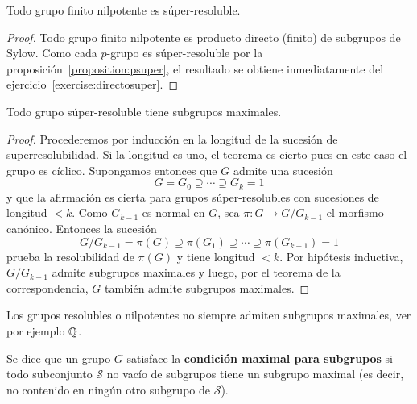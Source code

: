 \begin{corollary}
	Todo grupo finito nilpotente es súper-resoluble.
\end{corollary}

\begin{proof}
	Todo grupo finito nilpotente es producto directo (finito) de subgrupos de
	Sylow. Como cada $p$-grupo es súper-resoluble por la
	proposición~\ref{proposition:psuper}, el resultado se obtiene
	inmediatamente del ejercicio~\ref{exercise:directosuper}.
\end{proof}

\begin{theorem}
	Todo grupo súper-resoluble tiene subgrupos maximales.	
\end{theorem}

\begin{proof}
	Procederemos por inducción en la longitud de la sucesión de
	superresolubilidad. Si la longitud es uno, el teorema es cierto pues en
	este caso el grupo es cíclico. Supongamos entonces que $G$ admite una
	sucesión
	\[
		G=G_0\supseteq\cdots\supseteq G_k=1
	\]
	y que la afirmación es cierta para grupos súper-resolubles con sucesiones 
	de longitud $<k$. Como $G_{k-1}$ es normal en $G$, sea $\pi\colon G\to
	G/G_{k-1}$ el morfismo canónico. Entonces la sucesión
	\[
		G/G_{k-1}=\pi(G)\supseteq \pi(G_1)\supseteq\cdots\supseteq\pi(G_{k-1})=1
	\]
	prueba la resolubilidad de $\pi(G)$ y tiene longitud $<k$. Por hipótesis
	inductiva, $G/G_{k-1}$ admite subgrupos maximales y luego, por el teorema
	de la correspondencia, $G$ también admite subgrupos maximales.
\end{proof}

\begin{example}
	Los grupos resolubles o nilpotentes no siempre admiten
	subgrupos maximales, ver por ejemplo $\mathbb{Q}$.
\end{example}

\begin{definition}
	Se dice que un grupo $G$ satisface la \textbf{condición maximal para
	subgrupos} si 
	todo subconjunto $\mathcal{S}$ no vacío de subgrupos tiene un subgrupo
	maximal (es decir, no contenido en ningún otro subgrupo de $\mathcal{S}$). 
\end{definition}

